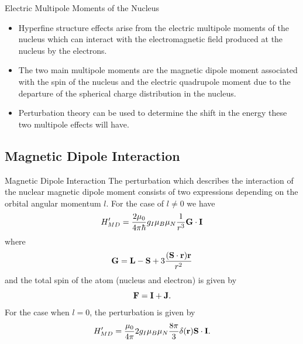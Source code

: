 \documentclass[aspectratio=1610,xcolor=dvipsnames,t]{beamer}
\begin{document}
\begin{frame}{Electric Multipole Moments of the Nucleus} 
\begin{itemize} 
    \item    Hyperfine structure effects arise from the electric multipole moments of the 
    nucleus which can interact with the electromagnetic field produced at the 
    nucleus by the electrons. 
    \item The two main multipole moments are the magnetic 
    dipole moment associated with the spin of the nucleus and the electric quadrupole
    moment due to the departure of the spherical charge distribution in the nucleus.
    \item Perturbation theory can be used to determine the shift in the energy these
    two multipole effects will have.
\end{itemize} 
\end{frame} 
       
    \subsection{Magnetic Dipole Interaction}
    \begin{frame}{Magnetic Dipole Interaction} 
    The perturbation which describes the interaction of the nuclear magnetic dipole 
    moment consists of two expressions depending on the orbital angular momentum $l$.
    For the case of $l \neq 0$ we have
    \begin{equation}
        H'_{MD} = \frac{2\mu_0}{4 \pi \hbar} g_I \mu_B \mu_N \frac{1}{r^3}
                   {\bf G} \cdot {\bf I}
    \end{equation}
    where
    \begin{equation}
        {\bf G} = {\bf L} - {\bf S} + 3 \frac{({\bf S} \cdot {\bf r}) {\bf r}}{r^2}
    \end{equation}
    and the total spin of the atom (nucleus and electron) is given by
    \begin{equation}
        {\bf F} = {\bf I} + {\bf J}.
    \end{equation}
    For the case when $l = 0$, the perturbation is given by
    \begin{equation}
        H'_{MD}  =  \frac{\mu_0}{4\pi} 2g_I \mu_B \mu_N \frac{8 \pi}{3} 
               \delta({\bf r}) {\bf S} \cdot {\bf I}.
    \end{equation}
    \end{frame} 
\end{document}
